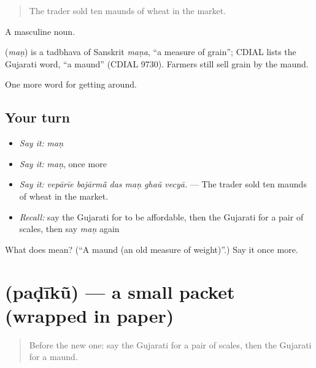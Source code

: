 \begin{quote}
The trader sold ten maunds of wheat in the market.
\end{quote}

A masculine noun.

\begin{cousinweb}
\textbf{} (\emph{maṇ}) is a tadbhava of Sanskrit \emph{maṇa}, \textquotedblleft{}a measure of grain\textquotedblright{}; CDIAL lists the Gujarati word, \textquotedblleft{}a maund\textquotedblright{} (CDIAL 9730). Farmers still sell grain by the maund.
\end{cousinweb}

\begin{grammarlens}[title={What you've built}]
One more word for getting around.
\end{grammarlens}

\subsection*{Your turn}
\begin{itemize}
\raggedright
  \item \emph{Say it:} \emph{maṇ}
  \item \emph{Say it:} \emph{maṇ}, once more
  \item \emph{Say it:} \emph{vepārīe bajārmā̃ das maṇ ghaũ vecyā.} — The trader sold ten maunds of wheat in the market.
  \item \emph{Recall:} say the Gujarati for to be affordable, then the Gujarati for a pair of scales, then say \emph{maṇ} again
\end{itemize}

\begin{tcolorbox}[breakable,colback=teal!4,colframe=teal!35!black,title={Before you move on}]
What does  mean? (\textquotedblleft{}A maund (an old measure of weight)\textquotedblright{}.) Say it once more.
\end{tcolorbox}
\section[\texorpdfstring{\gu{પડીકું} (paḍīkũ)}{પડીકું (paḍīkũ)}]{ (paḍīkũ) — a small packet (wrapped in paper)}

\label{lesson:GU-C430-padiku}



\begin{quote}
Before the new one: say the Gujarati for a pair of scales, then the Gujarati for a maund.
\end{quote}

